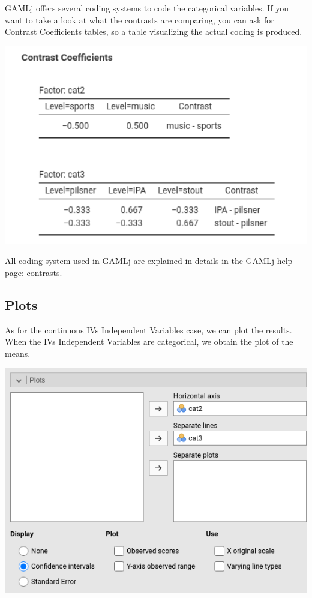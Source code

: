 \documentclass[
]{book}
\begin{document}
{GAMLj} offers several coding systems to code the categorical variables. If you want to take a look at what the contrasts are comparing, you can ask for {Contrast Coefficients tables}, so a table visualizing the actual coding is produced.

\includegraphics[width=5.79in]{bookletpics/2_anova_output4}

All coding system used in {GAMLj} are explained in details in the GAMLj help page: contrasts.

\hypertarget{plots}{%
\subsection{Plots}\label{plots}}

As for the continuous {IVs {Independent Variables} } case, we can plot the results. When the {IVs {Independent Variables} } are categorical, we obtain the plot of the means.

\includegraphics[width=7.65in]{bookletpics/2_anova_input5}
\end{document}
